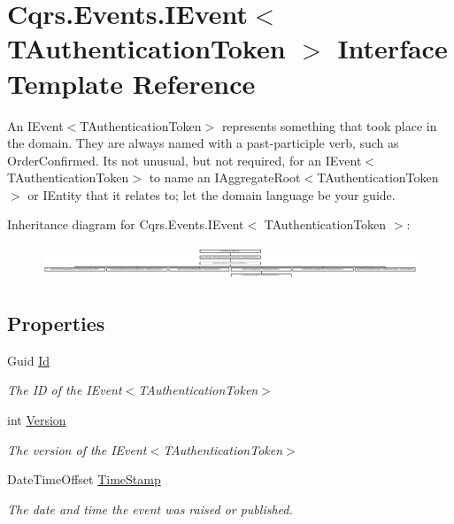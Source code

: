 \hypertarget{interfaceCqrs_1_1Events_1_1IEvent}{}\section{Cqrs.\+Events.\+I\+Event$<$ T\+Authentication\+Token $>$ Interface Template Reference}
\label{interfaceCqrs_1_1Events_1_1IEvent}


An I\+Event$<$\+T\+Authentication\+Token$>$ represents something that took place in the domain. They are always named with a past-\/participle verb, such as Order\+Confirmed. It\textquotesingle{}s not unusual, but not required, for an I\+Event$<$\+T\+Authentication\+Token$>$ to name an I\+Aggregate\+Root$<$\+T\+Authentication\+Token$>$ or I\+Entity that it relates to; let the domain language be your guide.  


Inheritance diagram for Cqrs.\+Events.\+I\+Event$<$ T\+Authentication\+Token $>$\+:\begin{figure}[H]
\begin{center}
\leavevmode
\includegraphics[height=1.032448cm]{interfaceCqrs_1_1Events_1_1IEvent}
\end{center}
\end{figure}
\subsection*{Properties}
\begin{DoxyCompactItemize}
\item 
Guid \hyperlink{interfaceCqrs_1_1Events_1_1IEvent_a2974e13d307c62c5cc438d668ff1783b_a2974e13d307c62c5cc438d668ff1783b}{Id}
\begin{DoxyCompactList}\small\item\em The ID of the I\+Event$<$\+T\+Authentication\+Token$>$ \end{DoxyCompactList}\item 
int \hyperlink{interfaceCqrs_1_1Events_1_1IEvent_a2754e056f483b9a8e59622a363276b15_a2754e056f483b9a8e59622a363276b15}{Version}
\begin{DoxyCompactList}\small\item\em The version of the I\+Event$<$\+T\+Authentication\+Token$>$ \end{DoxyCompactList}\item 
Date\+Time\+Offset \hyperlink{interfaceCqrs_1_1Events_1_1IEvent_a149d6ea1652cbcc63dbc45eaa71fade0_a149d6ea1652cbcc63dbc45eaa71fade0}{Time\+Stamp}
\begin{DoxyCompactList}\small\item\em The date and time the event was raised or published. \end{DoxyCompactList}\end{DoxyCompactItemize}


